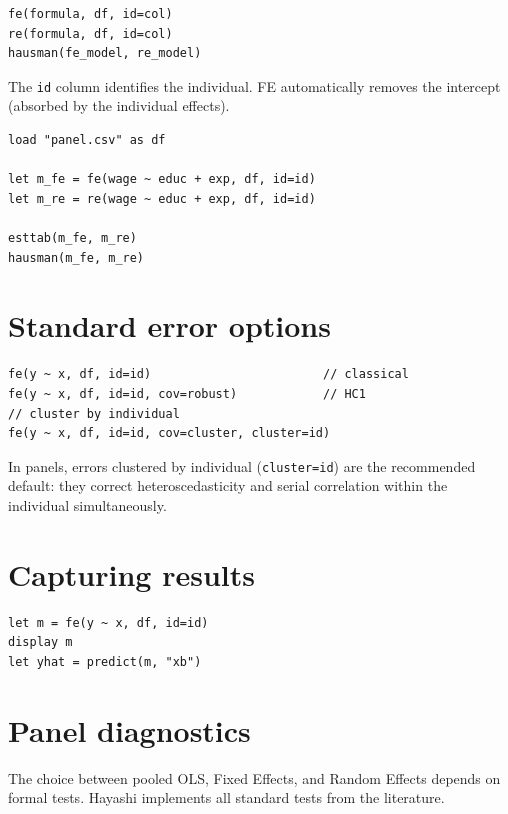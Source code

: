 \begin{lstlisting}
fe(formula, df, id=col)
re(formula, df, id=col)
hausman(fe_model, re_model)
\end{lstlisting}

The \lstinline{id} column identifies the individual. FE automatically removes
the intercept (absorbed by the individual effects).

\begin{lstlisting}[caption={Complete workflow}]
load "panel.csv" as df

let m_fe = fe(wage ~ educ + exp, df, id=id)
let m_re = re(wage ~ educ + exp, df, id=id)

esttab(m_fe, m_re)
hausman(m_fe, m_re)
\end{lstlisting}

\section{Standard error options}

\begin{lstlisting}
fe(y ~ x, df, id=id)                        // classical
fe(y ~ x, df, id=id, cov=robust)            // HC1
// cluster by individual
fe(y ~ x, df, id=id, cov=cluster, cluster=id)
\end{lstlisting}

\begin{nota}
  In panels, errors clustered by individual (\lstinline{cluster=id})
  are the recommended default: they correct heteroscedasticity and serial
  correlation within the individual simultaneously.
\end{nota}

\section{Capturing results}

\begin{lstlisting}
let m = fe(y ~ x, df, id=id)
display m
let yhat = predict(m, "xb")
\end{lstlisting}

\section{Panel diagnostics}

The choice between pooled OLS, Fixed Effects, and Random Effects depends on
formal tests. Hayashi implements all standard tests from the literature.

